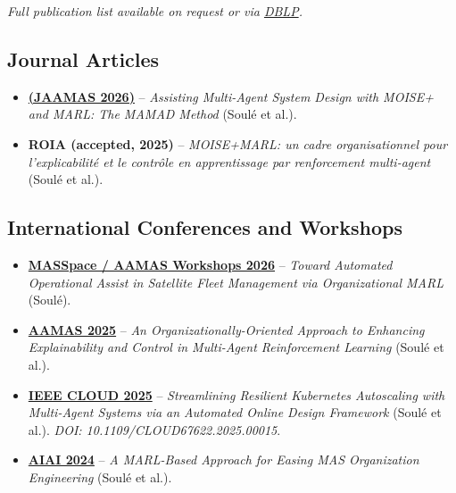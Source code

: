 \documentclass[11pt,a4paper,sans]{moderncv}
\begin{document}
 {\vspace{-0.5em} \hfill \tiny \textit{Full publication list available on request or via \href{https://dblp.org/pid/367/9947.html}{DBLP}.}}

\vspace{-1em}

\subsection*{Journal Articles}
\begin{itemize}
    \item \href{https://link.springer.com/article/10.1007/s10458-026-09740-0}{\textbf{(JAAMAS 2026)}} -- \emph{Assisting Multi-Agent System Design with MOISE+ and MARL: The MAMAD Method} (Soulé et al.).
    \item \textbf{ROIA (accepted, 2025)} -- \emph{MOISE+MARL: un cadre organisationnel pour l'explicabilité et le contrôle en apprentissage par renforcement multi-agent} (Soulé et al.).
\end{itemize}

\subsection*{International Conferences and Workshops}
\begin{itemize}
    \item \href{https://mas-space.github.io/aamas2026ws/papers/MASSpace-2026-Proceedings.pdf#page=96}{\textbf{MASSpace / AAMAS Workshops 2026}} -- \emph{Toward Automated Operational Assist in Satellite Fleet Management via Organizational MARL} (Soulé).
    \item \href{https://dl.acm.org/doi/10.5555/3709347.3743834}{\textbf{AAMAS 2025}} -- \emph{An Organizationally-Oriented Approach to Enhancing Explainability and Control in Multi-Agent Reinforcement Learning} (Soulé et al.).
    \item \href{https://ieeexplore.ieee.org/document/11120591}{\textbf{IEEE CLOUD 2025}} -- \emph{Streamlining Resilient Kubernetes Autoscaling with Multi-Agent Systems via an Automated Online Design Framework} (Soulé et al.). \textit{DOI: 10.1109/CLOUD67622.2025.00015}.
    \item \href{https://link.springer.com/chapter/10.1007/978-3-031-63223-5_24}{\textbf{AIAI 2024}} -- \emph{A MARL-Based Approach for Easing MAS Organization Engineering} (Soulé et al.).
\end{itemize}
\smallskip
\end{document}
